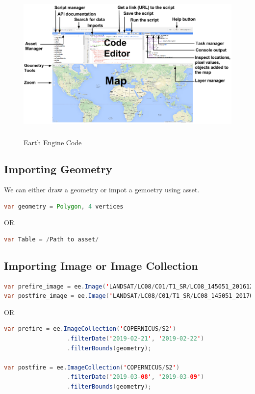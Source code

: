 \documentclass[12pt]{svproc}
\begin{document}
 \begin{figure}{}
	\includegraphics[width=0.7\linewidth, height=7cm]{p6.png} 
	\label{fig:subim1}
	\centering
	\caption{Earth Engine Code}
\end{figure}

\subsection{Importing Geometry}
We can either draw a geometry or impot a gemoetry using asset.

\begin{lstlisting}[language=Java, caption=draw geometry]
var geometry = Polygon, 4 vertices
\end{lstlisting}

OR

\begin{lstlisting}[language=Java, caption=import geometry]
var Table = /Path to asset/
\end{lstlisting}

\subsection{Importing Image or Image Collection}

\begin{lstlisting}[language=Java, caption=import single image]
var prefire_image = ee.Image('LANDSAT/LC08/C01/T1_SR/LC08_145051_20161224');
var postfire_image = ee.Image('LANDSAT/LC08/C01/T1_SR/LC08_145051_20170330');
\end{lstlisting}

OR 

\begin{lstlisting}[language=Java, caption=import geometry]
var prefire = ee.ImageCollection('COPERNICUS/S2')
                  .filterDate('2019-02-21', '2019-02-22')
                  .filterBounds(geometry);
                  
var postfire = ee.ImageCollection('COPERNICUS/S2')
                  .filterDate('2019-03-08', '2019-03-09')
                  .filterBounds(geometry);
\end{lstlisting}
\end{document}
